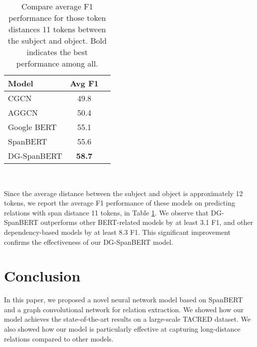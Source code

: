 \documentclass{article}
\begin{document}
		 

\begin{table}[ht]
	\centering
\begin{tabular}{lcc}
	\hline
     \textbf{Model} &  \textbf{Avg F1}   \\
	\hline
	CGCN & 49.8\\
	AGGCN & 50.4\\
	Google BERT & 55.1  \\
	SpanBERT & 55.6  \\
	DG-SpanBERT & \textbf{58.7} \\
	\hline

  \end{tabular}\\
\caption{Compare average F1 performance for those token distances  11 tokens between the subject and object. Bold indicates the best performance among all.}
\label{Tab:02}
	 \end{table}
Since the average distance between the subject and object is approximately 12 tokens, we report the average F1 performance of these models on predicting relations   with span distance  11 tokens,  in  Table \ref{Tab:02}. We observe that DG-SpanBERT outperforms other BERT-related models by at least 3.1 F1, and  other dependency-based models by at least 8.3 F1.  This significant improvement confirms the effectiveness of our DG-SpanBERT model.   


		 

		 
		 


    


\section{Conclusion}
In this paper, we proposed a novel neural network model based on SpanBERT and a graph convolutional network for relation extraction. We showed how our model achieves the state-of-the-art results on a large-scale TACRED dataset. We also showed how our model is particularly effective at capturing long-distance relations compared to other models.

  
  
\end{document}
